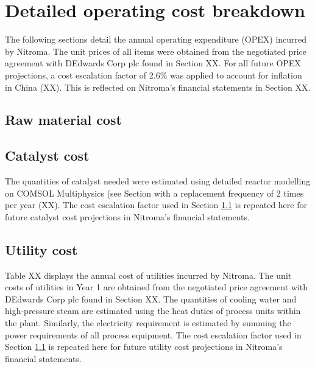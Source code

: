 \section{Detailed operating cost breakdown}
The following sections detail the annual operating expenditure (OPEX) incurred by Nitroma. The unit prices of all items were obtained from the negotiated price agreement with DEdwards Corp plc found in Section XX. For all future OPEX projections, a cost escalation factor of 2.6\% was applied to account for inflation in China (XX). This is reflected on Nitroma’s financial statements in Section XX.

\subsection{Raw material cost}
\label{sec:opex-raw-material}

\subsection{Catalyst cost}
 The quantities of catalyst needed were estimated using detailed reactor modelling on COMSOL Multiphysics (see Section with a replacement frequency of 2 times per year (XX). The cost escalation factor used in Section \ref{sec:opex-raw-material} is repeated here for future catalyst cost projections in Nitroma’s financial statements.  

\subsection{Utility cost}
Table XX displays the annual cost of utilities incurred by Nitroma. The unit costs of utilities in Year 1 are obtained from the negotiated price agreement with DEdwards Corp plc found in Section XX. The quantities of cooling water and high-pressure steam are estimated using the heat duties of process units within the plant. Similarly, the electricity requirement is estimated by summing the power requirements of all process equipment. The cost escalation factor used in Section \ref{sec:opex-raw-material} is repeated here for future utility cost projections in Nitroma’s financial statements.  

